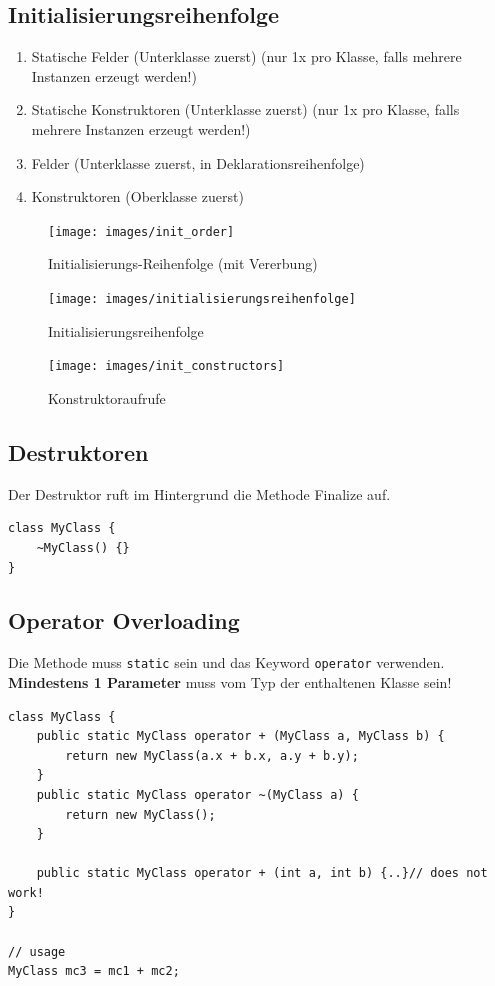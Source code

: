 \subsection{Initialisierungsreihenfolge}
\begin{enumerate}
	\item Statische Felder (Unterklasse zuerst) (nur 1x pro Klasse, falls mehrere Instanzen erzeugt werden!)
	\item Statische Konstruktoren (Unterklasse zuerst) (nur 1x pro Klasse, falls mehrere Instanzen erzeugt werden!)
	\item Felder (Unterklasse zuerst, in Deklarationsreihenfolge)
	\item Konstruktoren (Oberklasse zuerst)
\end{enumerate}

\begin{figure}[h]
\centering
\texttt{[image: images/init\_order]}
\caption{Initialisierungs-Reihenfolge (mit Vererbung)}
\label{fig:initorder}
\end{figure}

\begin{figure}[h]
\centering
\texttt{[image: images/initialisierungsreihenfolge]}
\caption{Initialisierungsreihenfolge}
\label{fig:initialisierungsreihenfolge}
\end{figure}

\begin{figure}[h]
\centering
\texttt{[image: images/init\_constructors]}
\caption{Konstruktoraufrufe}
\label{fig:initconstructors}
\end{figure}

\subsection{Destruktoren}
Der Destruktor ruft im Hintergrund die Methode Finalize auf. 
\begin{lstlisting}
class MyClass {
	~MyClass() {}
}
\end{lstlisting}

\subsection{Operator Overloading}
Die Methode muss \lstinline|static| sein und das Keyword \lstinline|operator| verwenden. \textbf{Mindestens 1 Parameter} muss vom Typ der enthaltenen Klasse sein!
\begin{lstlisting}
class MyClass {
	public static MyClass operator + (MyClass a, MyClass b) {
		return new MyClass(a.x + b.x, a.y + b.y);
	}
	public static MyClass operator ~(MyClass a) {
		return new MyClass();
	}
	
	public static MyClass operator + (int a, int b) {..}// does not work!
}

// usage
MyClass mc3 = mc1 + mc2;
\end{lstlisting}


